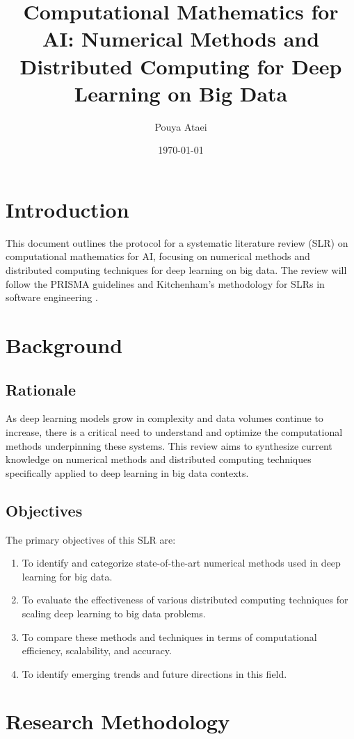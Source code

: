 \documentclass[a4paper,12pt]{article}
\title{Computational Mathematics for AI: Numerical Methods and Distributed Computing for Deep Learning on Big Data}
\author{Pouya Ataei}
\date{\today}
\begin{document}
\maketitle

\section{Introduction}
This document outlines the protocol for a systematic literature review (SLR) on computational mathematics for AI, focusing on numerical methods and distributed computing techniques for deep learning on big data. The review will follow the PRISMA guidelines \citep{moher2009preferred} and Kitchenham's methodology for SLRs in software engineering \citep{kitchenham2007guidelines}.

\section{Background}
\subsection{Rationale}
As deep learning models grow in complexity and data volumes continue to increase, there is a critical need to understand and optimize the computational methods underpinning these systems. This review aims to synthesize current knowledge on numerical methods and distributed computing techniques specifically applied to deep learning in big data contexts.

\subsection{Objectives}
The primary objectives of this SLR are:
\begin{enumerate}
    \item To identify and categorize state-of-the-art numerical methods used in deep learning for big data.
    \item To evaluate the effectiveness of various distributed computing techniques for scaling deep learning to big data problems.
    \item To compare these methods and techniques in terms of computational efficiency, scalability, and accuracy.
    \item To identify emerging trends and future directions in this field.
\end{enumerate}

\section{Research Methodology}
\end{document}
